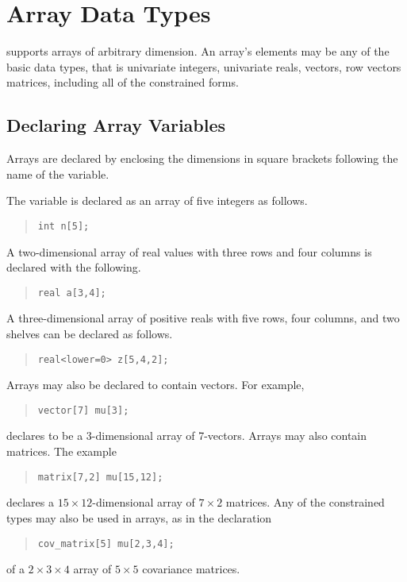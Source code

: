 \section{Array Data Types}

\Stan supports arrays of arbitrary dimension.  An array's elements may
be any of the basic data types, that is univariate integers,
univariate reals, vectors, row vectors matrices, including all of the
constrained forms.

\subsection{Declaring Array Variables}

Arrays are declared by enclosing the dimensions in square brackets
following the name of the variable.

The variable  is declared as an array of five integers as follows.
%
\begin{quote}
\begin{Verbatim}  
int n[5];
\end{Verbatim}
\end{quote}
% 
A two-dimensional array of real values with three rows and four columns is
declared with the following.
%
\begin{quote}
\begin{Verbatim}  
real a[3,4];
\end{Verbatim}
\end{quote}
% 
A three-dimensional array  of positive reals with five rows, four
columns, and two shelves can be declared as follows.
%
\begin{quote}
\begin{Verbatim} 
real<lower=0> z[5,4,2];
\end{Verbatim}
\end{quote}
%

Arrays may also be declared to contain vectors.  For example,
%
\begin{quote}
\begin{Verbatim}  
vector[7] mu[3];
\end{Verbatim}
\end{quote}
% 
declares  to be a 3-dimensional array of 7-vectors.  
Arrays may also contain matrices.  The example
%
\begin{quote}
\begin{Verbatim} 
matrix[7,2] mu[15,12];
\end{Verbatim}
\end{quote}
%
declares a $15 \times 12$-dimensional array of $7 \times 2$ matrices.
Any of the constrained types may also be used in arrays, as in the
declaration
%
\begin{quote}
\begin{Verbatim}  
cov_matrix[5] mu[2,3,4];
\end{Verbatim}
\end{quote}
% 
of a $2 \times 3 \times 4$ array of $5 \times 5$ covariance matrices.

